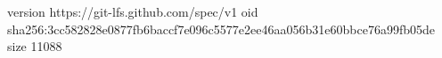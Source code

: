 version https://git-lfs.github.com/spec/v1
oid sha256:3cc582828e0877fb6baccf7e096c5577e2ee46aa056b31e60bbce76a99fb05de
size 11088
